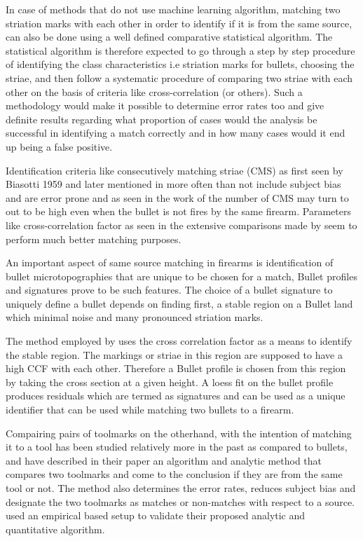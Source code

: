 \documentclass[12pt]{article}
\begin{document}
In case of methods that do not use machine learning algorithm, matching
two striation marks with each other in order to identify if it is from
the same source, can also be done using a well defined comparative
statistical algorithm. The statistical algorithm is therefore expected
to go through a step by step procedure of identifying the class
characteristics i.e striation marks for bullets, choosing the striae,
and then follow a systematic procedure of comparing two striae with each
other on the basis of criteria like cross-correlation (or others). Such
a methodology would make it possible to determine error rates too and
give definite results regarding what proportion of cases would the
analysis be successful in identifying a match correctly and in how many
cases would it end up being a false positive.

Identification criteria like consecutively matching striae (CMS) as
first seen by Biasotti 1959 \citet{biasotti} and later mentioned in
\citet{chu2013} more often than not include subject bias and are error
prone and as seen in the work of \citet{miller} the number of CMS may
turn to out to be high even when the bullet is not fires by the same
firearm. Parameters like cross-correlation factor as seen in the
extensive comparisons made by \citep{aoas} seem to perform much better
matching purposes.

An important aspect of same source matching in firearms is
identification of bullet microtopographies that are unique to be chosen
for a match, Bullet profiles and signatures prove to be such features.
The choice of a bullet signature to uniquely define a bullet depends on
finding first, a stable region on a Bullet land which minimal noise and
many pronounced striation marks. \citet{aoas}

The method employed by \citet{aoas} uses the cross correlation factor as
a means to identify the stable region. The markings or striae in this
region are supposed to have a high CCF with each other. Therefore a
Bullet profile is chosen from this region by taking the cross section at
a given height. A loess fit on the bullet profile produces residuals
which are termed as signatures and can be used as a unique identifier
that can be used while matching two bullets to a firearm.

Compairing pairs of toolmarks on the otherhand, with the intention of
matching it to a tool has been studied relatively more in the past as
compared to bullets, and \citet{chumbley} have described in their paper
an algorithm and analytic method that compares two toolmarks and come to
the conclusion if they are from the same tool or not. The method also
determines the error rates, reduces subject bias and designate the two
toolmarks as matches or non-matches with respect to a source.
\citet{chumbley} used an empirical based setup to validate their
proposed analytic and quantitative algorithm.
\end{document}

